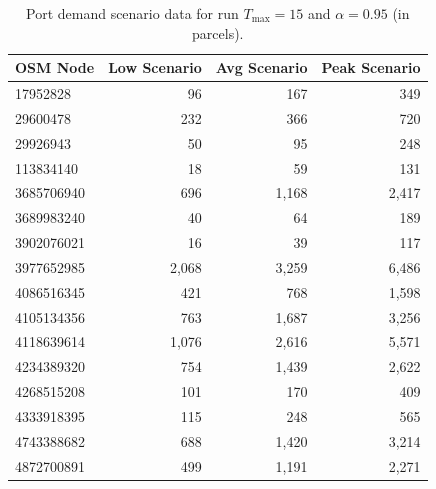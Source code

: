 \documentclass[12pt]{article}
\begin{document}
\begin{table}[htbp]
  \centering
  \caption{Port demand scenario data for run \(T_{\max}=15\) and \(\alpha=0.95\) (in parcels).}
  \label{anx:port_demand_scenarios_t15_a095}
  \begin{tabular}{lrrr}
    \toprule
    \textbf{OSM Node} & \textbf{Low Scenario} & \textbf{Avg Scenario} & \textbf{Peak Scenario} \\
    \midrule
    17952828          & 96                    & 167                   & 349                    \\
    29600478          & 232                   & 366                   & 720                    \\
    29926943          & 50                    & 95                    & 248                    \\
    113834140         & 18                    & 59                    & 131                    \\
    3685706940        & 696                   & 1,168                 & 2,417                  \\
    3689983240        & 40                    & 64                    & 189                    \\
    3902076021        & 16                    & 39                    & 117                    \\
    3977652985        & 2,068                 & 3,259                 & 6,486                  \\
    4086516345        & 421                   & 768                   & 1,598                  \\
    4105134356        & 763                   & 1,687                 & 3,256                  \\
    4118639614        & 1,076                 & 2,616                 & 5,571                  \\
    4234389320        & 754                   & 1,439                 & 2,622                  \\
    4268515208        & 101                   & 170                   & 409                    \\
    4333918395        & 115                   & 248                   & 565                    \\
    4743388682        & 688                   & 1,420                 & 3,214                  \\
    4872700891        & 499                   & 1,191                 & 2,271                  \\

\end{tabular}
\end{table}
\end{document}
